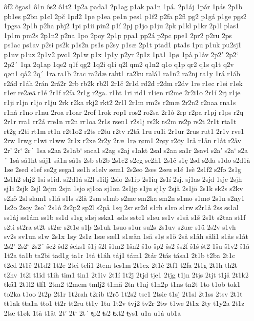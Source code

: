 ôf2
ôgas1
ô1n
ôs2
ô1t2
1p2a
pada1
2p1ag
p1ak
pa1n
1pá.
2p1áj
1pár
1pás
2p1b
pb1es
p2bn
p1cl
2pč
1pd2
1pe
p1ea
pe1n
pes1
p1f2
p2fa
p2fl
pg2
p1gá
p1ge
pgs2
1pgsa
2p1h
p2ha
phj2
1pi
p1ii
pin2
p1í
2pj
p1jo
p1ju
2pk
p1kl
p1kr
2p1l
plas1
1p1m
pm2s
2p1n2
p2na
1po
2poy
2p1p
ppa1
pp2á
p2pc
ppe1
2pr2
p2ru
2ps
ps1ac
ps1av
p2si
ps2k
p1s2n
ps1s
p2sy
p1sæ
2p1t
ptad1
pta1s
1pu
p1uk
pu2sj1
p1uv
p1uz
2p1v2
pvc1
2p1w
p1x
1p1y
p2yr
2p1z
1pä1
1pø
1på
p1åv
2p2'
2p2`
2p2´
1qa
2q1ap
1qe2
q1f
qg2
1q2i
q1í
q2l
qm2
q1n2
q1o
q1p
qr2
q1s
q1t
q2v
qøn1
qå2
2q´
1ra
ra1b
2rac
ra2dæ
raht1
ra2ku
ralá1
ra1n2
ra2nj
ra1y
1rá
r1áb
r2ád
r1áh
2rán
2rá2r
2rb
rb2k
rb2l
2r1č
2r1d
rd2d
r2dm
r2dv
1re
r1ec
r1ei
r1ek
r1er
re2æä
r1é
2r1f
r2fa
2r1g
r2ga.
r1ht
1ri
rid1
r1ien
ri2me
2r2i1o
2r1í
2rj
r1je
r1ji
r1jn
r1jo
r1ju
2rk
r2ka
rkj2
rkt2
2r1l
2r1m
rm2s
r2mæ
2r2n2
r2naa
rna1s
r1ná
r1no
r1nu
2roa
r1oar
2rof
1rok
rop1
ros2
ro2sa
2r1ò
2rp
r2pa
r1pj
r1ps
r2q
2r1r
rra1
rr2á
rre1n
rr2n
rr1oa
2r1s
rsen1
r2s1j
rs2k
rs2m
rs2p
rs2t
2r1t
rta1t
rt2g
r2ti
rt1m
rt1n
r2t1o2
r2ts
r2tu
r2tv
r2tå
1ru
ru1i
2r1ur
2rus
rut1
2r1v
rve1
2rw
1rwg
r1wi
r1ww
2r1x
r2xe
2r2y
2ræ
1rø
røm1
2røy
r2öy
1rå
r1ån
r1åt
r2åv
2r'
2r`
2r´
1sa
s2aa
2s1ab`
saca1
s2ag
s2aj
s1akt
2sal
s2an
sa1r
2savl
s2a'
s2a`
s2a´
1sá
sá1ht
sáj1
sá1n
sá1s
2sb
sb2b
2s1c2
s2cg
sc2h1
2s1č
s1ç
2sd
s2da
s1do
s2d1å
1se
2sed
s1ef
se2g
sega1
se1h
s1elv
sem1
2s2eo
2ses
2seu
s1é
1sè
2s1f2
s2fo
2s1g
2s1h2
shj2
1si
s1id.
si2d1á
si2l
s1ilj
2sio
2s1ip
2s1iq
2s1í
2sj.
sj1as
2sjd
1sje
2sjh
sj1i
2sjk
2sjl
2sjm
2sjn
1sjo
sj1oa
sj1on
2s1jp
s1ju
sj1y
2sjä
2s1jö
2s1k
sk2s
s2kv
s2kö
2sl
slam1
s1lá
s1ls
s2lå
2sm
s1mb
s2me
sm2ka
sm2n
s1mo
s1mø
2s1n
s2ny1
1s2o
2soy
2so'
2s1ó
2s2p2
sp2l
s2på
1sq
2sr
sr2d
s1rh
s1ro
s1rw
s2r1å
2ss
ss1al
ss1áj
ss1ám
ss1b
ss1d
s1sg
s1sj
sska1
ss1s
sste1
s1su
ss1v
s1så
s1š
2s1t
s2taa
st1f
s2ti
st2ra
st2t
st2æ
s2t1ø
s1þ
2s1uk
1suo
s1ur
su2s
2s1uv
s2uæ
s1ü
2s2v
s1vh
sv2s
sv1un
s1w
2s1x
1sy
2s1z
1sæ
sæl1
s1æän
1sä
s1ø
s1ö
2så
s1åh
såli1
s1ås
s1åt
2s2'
2s2`
2s2´
šc2
šd2
šeks1
š1j
š2l
š1m2
1šn2
š1o
šp2
šs2
šs2f
š1š
št2
1šu
š1v2
š1å
1t2a
ta1b
ta2bi
tad1g
ta1r
1tá
t1áh
táj1
tám1
2tár
2tás
tása1
2t1b
t2ba
2t1c
t2cd
2t1č
2t1d2
1t2e
2tei
teli1
2tem
tes1m
2t1ex
2t1é
2tf1
t2fa
2t1g
2t1h
th2t
t2hv
1t2i
t1id
t1ih
tim1
tin1
2t1iv
2t1í
1t2j
2tjd
tje1
2tjg
t1jn
2tjs
2tjt
t1jå
2t1k2
tkä1
2t1l2
tlf1
2tm2
t2mem
tmlj2
t1mä
2tn
t1nj
t1n2p
t1ns
tn2t
1to
t1ob
tok1
to2ka
t1oo
2t2p
2t1r
1t2rah
t2rib
t2rö
1t2s2
tse1
2tsie
t1sj
2t1sl
2t1ss
2tsv
2t1t
tt1ak
tta1n
tto1
tt2r
tt2ru
tt1y
1tu
1t2v
tvj2
tv2r
2tw
t1we
2t1x
2ty
t1y2a
2t1z
2tæ
t1øk
1tå
t1åt
2t'
2t`
2t´
ŧp2
ŧs2
ŧxt2
ŧys1
u1a
u1á
ub1a

